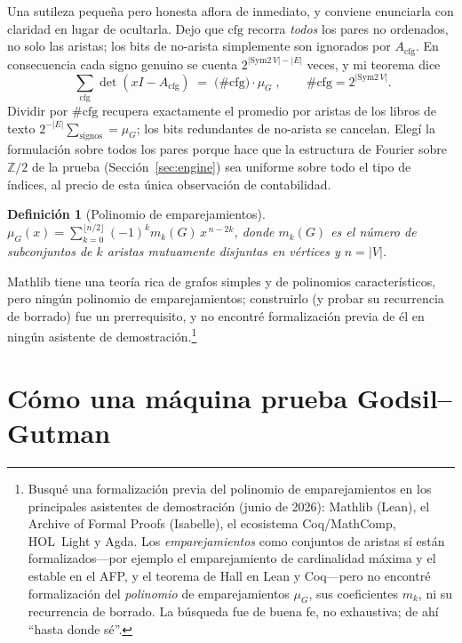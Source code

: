 \documentclass[11pt]{article}
\newtheorem{definition}{Definición}
\newcommand{\Z}{\mathbb{Z}}
\begin{document}
Una sutileza pequeña pero honesta aflora de inmediato, y conviene enunciarla con
claridad en lugar de ocultarla. Dejo que $\mathrm{cfg}$ recorra \emph{todos} los
pares no ordenados, no solo las aristas; los bits de no-arista simplemente son
ignorados por $A_{\mathrm{cfg}}$. En consecuencia cada signo genuino se cuenta
$2^{|\mathrm{Sym2}\,V|-|E|}$ veces, y mi teorema dice
\[
  \boxed{\;\sum_{\mathrm{cfg}}\det(xI-A_{\mathrm{cfg}})
  \;=\;\bigl(\#\mathrm{cfg}\bigr)\cdot \mu_G\;},
  \qquad \#\mathrm{cfg}=2^{|\mathrm{Sym2}\,V|}.
\]
Dividir por $\#\mathrm{cfg}$ recupera exactamente el promedio por aristas de los
libros de texto $2^{-|E|}\sum_{\text{signos}}=\mu_G$; los bits redundantes de
no-arista se cancelan. Elegí la formulación sobre todos los pares porque hace que
la estructura de Fourier sobre $\Z/2$ de la prueba (Sección~\ref{sec:engine}) sea
uniforme sobre todo el tipo de índices, al precio de esta única observación de
contabilidad.

\begin{definition}[Polinomio de emparejamientos]
$\mu_G(x)=\sum_{k=0}^{\lfloor n/2\rfloor}(-1)^k m_k(G)\,x^{\,n-2k}$, donde
$m_k(G)$ es el número de subconjuntos de $k$ aristas mutuamente disjuntas en
vértices y $n=|V|$.
\end{definition}

Mathlib tiene una teoría rica de grafos simples y de polinomios característicos,
pero ningún polinomio de emparejamientos; construirlo (y probar su recurrencia de
borrado) fue un prerrequisito, y no encontré formalización previa de él en
ningún asistente de demostración.\footnote{Busqué una formalización
previa del polinomio de emparejamientos en los principales asistentes de
demostración (junio de 2026): Mathlib (Lean), el Archive of Formal Proofs
(Isabelle), el ecosistema Coq/MathComp, HOL~Light y Agda. Los
\emph{emparejamientos} como conjuntos de aristas sí están formalizados---por
ejemplo el emparejamiento de cardinalidad máxima y el estable en el AFP, y el
teorema de Hall en Lean y Coq---pero no encontré formalización del \emph{polinomio}
de emparejamientos $\mu_G$, sus coeficientes $m_k$, ni su recurrencia de borrado.
La búsqueda fue de buena fe, no exhaustiva; de ahí ``hasta donde sé''.}

\section{Cómo una máquina prueba Godsil--Gutman}
\label{sec:gg}
\end{document}
